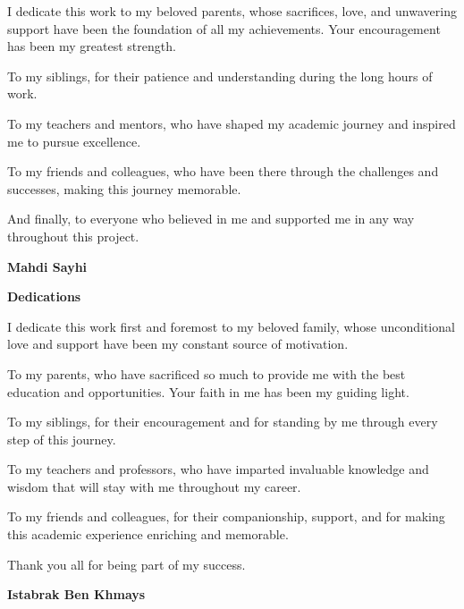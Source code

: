\documentclass[12pt,a4paper]{article}
\begin{document}
\begin{onehalfspace}
\fontsize{13}{16}\selectfont

I dedicate this work to my beloved parents, whose sacrifices, love, and unwavering support have been the foundation of all my achievements. Your encouragement has been my greatest strength.

To my siblings, for their patience and understanding during the long hours of work.

To my teachers and mentors, who have shaped my academic journey and inspired me to pursue excellence.

To my friends and colleagues, who have been there through the challenges and successes, making this journey memorable.

And finally, to everyone who believed in me and supported me in any way throughout this project.

\end{onehalfspace}

\vfill
\begin{flushright}
{\large\bfseries Mahdi Sayhi}
\end{flushright}

\newpage


\vspace*{1cm}

\begin{center}
{\bfseries\fontsize{22}{26}\selectfont Dedications}
\end{center}

\vspace{1cm}

\begin{onehalfspace}
\fontsize{13}{16}\selectfont

I dedicate this work first and foremost to my beloved family, whose unconditional love and support have been my constant source of motivation.

To my parents, who have sacrificed so much to provide me with the best education and opportunities. Your faith in me has been my guiding light.

To my siblings, for their encouragement and for standing by me through every step of this journey.

To my teachers and professors, who have imparted invaluable knowledge and wisdom that will stay with me throughout my career.

To my friends and colleagues, for their companionship, support, and for making this academic experience enriching and memorable.

Thank you all for being part of my success.

\end{onehalfspace}

\vfill
\begin{flushright}
{\large\bfseries Istabrak Ben Khmays}
\end{flushright}
\end{document}
